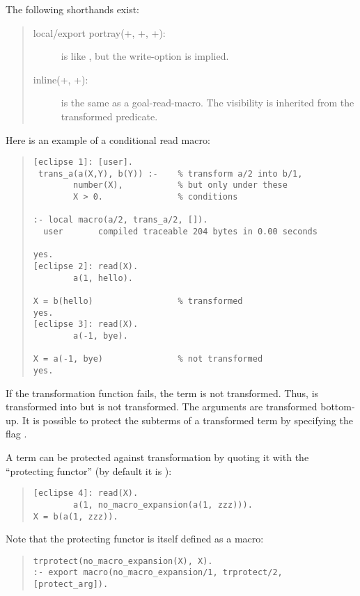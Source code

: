 The following shorthands exist:
\begin{quote}
\begin{description}

\item[local/export portray(+,
      +, +):]
    is like
    ,
    but the write-option is implied.

\item[inline(+, +):]
    is the same as a goal-read-macro. The visibility is inherited
    from the transformed predicate.

\end{description}
\end{quote}

Here is an example of a conditional read macro:
\begin{quote}
\begin{verbatim}
[eclipse 1]: [user].
 trans_a(a(X,Y), b(Y)) :-    % transform a/2 into b/1,
        number(X),           % but only under these
        X > 0.               % conditions

:- local macro(a/2, trans_a/2, []).
  user       compiled traceable 204 bytes in 0.00 seconds

yes.
[eclipse 2]: read(X).
        a(1, hello).

X = b(hello)                 % transformed
yes.
[eclipse 3]: read(X).
        a(-1, bye).

X = a(-1, bye)               % not transformed
yes.
\end{verbatim}
\end{quote}
If the transformation function fails, the term is not transformed. Thus,
 is transformed into  but
is not transformed.
The arguments are transformed bottom-up. It is possible to protect the
subterms of a transformed term by specifying the flag .

A term can be protected against transformation by quoting it with
the ``protecting functor'' (by default it is
):
\begin{quote}
\begin{verbatim}
[eclipse 4]: read(X).
        a(1, no_macro_expansion(a(1, zzz))).
X = b(a(1, zzz)).
\end{verbatim}
\end{quote}
Note that the protecting functor is itself defined as a macro:
\begin{quote}
\begin{verbatim}
trprotect(no_macro_expansion(X), X).
:- export macro(no_macro_expansion/1, trprotect/2, [protect_arg]).
\end{verbatim}
\end{quote}


